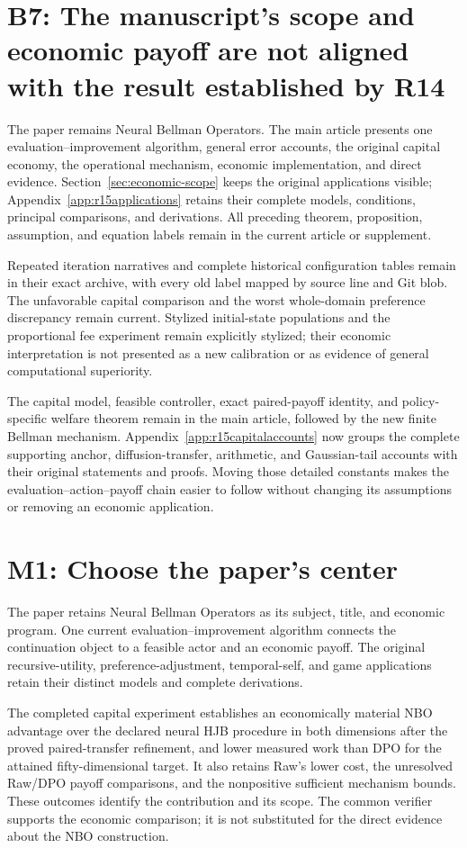 \section*{B7: The manuscript's scope and economic payoff are not aligned with the result established by R14}
The paper remains Neural Bellman Operators. The main article presents one evaluation--improvement algorithm, general error accounts, the original capital economy, the operational mechanism, economic implementation, and direct evidence. Section~\ref{sec:economic-scope} keeps the original applications visible; Appendix~\ref{app:r15applications} retains their complete models, conditions, principal comparisons, and derivations. All preceding theorem, proposition, assumption, and equation labels remain in the current article or supplement.

Repeated iteration narratives and complete historical configuration tables remain in their exact archive, with every old label mapped by source line and Git blob. The unfavorable capital comparison and the worst whole-domain preference discrepancy remain current. Stylized initial-state populations and the proportional fee experiment remain explicitly stylized; their economic interpretation is not presented as a new calibration or as evidence of general computational superiority.

The capital model, feasible controller, exact paired-payoff identity, and policy-specific welfare theorem remain in the main article, followed by the new finite Bellman mechanism. Appendix~\ref{app:r15capitalaccounts} now groups the complete supporting anchor, diffusion-transfer, arithmetic, and Gaussian-tail accounts with their original statements and proofs. Moving those detailed constants makes the evaluation--action--payoff chain easier to follow without changing its assumptions or removing an economic application.

\section*{M1: Choose the paper's center}
The paper retains Neural Bellman Operators as its subject, title, and economic program. One current evaluation--improvement algorithm connects the continuation object to a feasible actor and an economic payoff. The original recursive-utility, preference-adjustment, temporal-self, and game applications retain their distinct models and complete derivations.

The completed capital experiment establishes an economically material NBO advantage over the declared neural HJB procedure in both dimensions after the proved paired-transfer refinement, and lower measured work than DPO for the attained fifty-dimensional target. It also retains Raw's lower cost, the unresolved Raw/DPO payoff comparisons, and the nonpositive sufficient mechanism bounds. These outcomes identify the contribution and its scope. The common verifier supports the economic comparison; it is not substituted for the direct evidence about the NBO construction.

